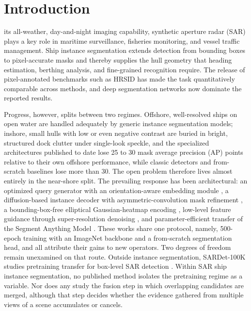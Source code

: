 \section{Introduction}
\label{sec:intro}

 its all-weather, day-and-night imaging capability, synthetic aperture radar (SAR) plays a key role in maritime surveillance, fisheries monitoring, and vessel traffic management. Ship instance segmentation extends detection from bounding boxes to pixel-accurate masks and thereby supplies the hull geometry that heading estimation, berthing analysis, and fine-grained recognition require. The release of pixel-annotated benchmarks such as HRSID \cite{hrsid2020} has made the task quantitatively comparable across methods, and deep segmentation networks now dominate the reported results.

Progress, however, splits between two regimes. Offshore, well-resolved ships on open water are handled adequately by generic instance segmentation models; inshore, small hulls with low or even negative contrast are buried in bright, structured dock clutter under single-look speckle, and the specialized architectures published to date lose 25 to 30 mask average precision (AP) points relative to their own offshore performance, while classic detectors and from-scratch baselines lose more than 30. The open problem therefore lives almost entirely in the near-shore split. The prevailing response has been architectural: an optimized query generator with an orientation-aware embedding module \cite{o2former2025}, a diffusion-based instance decoder with asymmetric-convolution mask refinement \cite{diffsar2025}, a bounding-box-free elliptical Gaussian-heatmap encoding \cite{gaussheatmap2024}, low-level feature guidance through super-resolution denoising \cite{lfgnet2022}, and parameter-efficient transfer of the Segment Anything Model \cite{sarsam2025}. These works share one protocol, namely, 500-epoch training with an ImageNet backbone and a from-scratch segmentation head, and all attribute their gains to new operators. Two degrees of freedom remain unexamined on that route. Outside instance segmentation, SARDet-100K studies pretraining transfer for box-level SAR detection \cite{sardet100k2024}. Within SAR ship instance segmentation, no published method isolates the pretraining regime as a variable. Nor does any study the fusion step in which overlapping candidates are merged, although that step decides whether the evidence gathered from multiple views of a scene accumulates or cancels.

